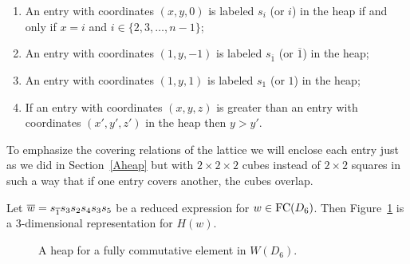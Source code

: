 \begin{enumerate}[leftmargin=0.6in]
\item An entry with coordinates $(x,y,0)$ is labeled $s_i$ (or $i$) in the heap if and only if $x=i$ and $i\in \{2,3,\ldots,n-1\}$;
\item  An entry with coordinates $(1,y,-1)$ is labeled $s_{\overline{1}}$ (or $\overline{1}$) in the heap;
\item  An entry with coordinates $(1,y,1)$ is labeled $s_{1}$ (or $1$) in the heap;
\item If an entry with coordinates $(x,y,z)$ is greater than an entry with coordinates $(x',y',z')$ in the heap then $y > y'$.
\end{enumerate}
To emphasize the covering relations of the lattice we will enclose each entry just as we did in Section~\ref{Aheap} but with  $2\times 2\times 2$ cubes instead of $2\times 2$ squares in such a way that if one entry covers another, the cubes overlap.
\begin{example}
Let $\overline{w} = s_{\overline{1}}s_{3}s_{2}s_{4}s_{3}s_{5}$ be a reduced expression for $w\in \operatorname{FC}(D_{6})$. Then Figure~\ref{fig:Dheap} is a 3-dimensional representation for $H(w)$.
\begin{figure}[h]
\centering
{}
\caption{A heap for a fully commutative element in $W(D_{6})$.}
\label{fig:Dheap}
\end{figure}
\end{example}


%

